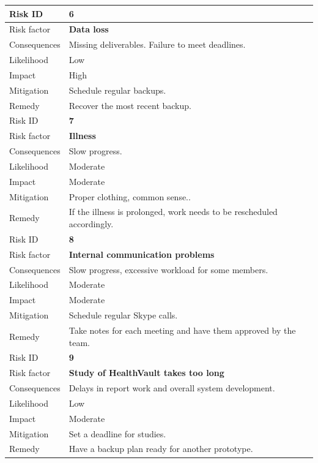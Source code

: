 \begin{table}[h]
\begin{tabular}{ | l | p{11.5cm} | }
  \hline

  Risk ID & \textbf{6} \\
  \hline\noalign{\smallskip}\noalign{\smallskip}\hline
  Risk factor   & \textbf{Data loss} \\
  Consequences  & Missing deliverables. Failure to meet deadlines. \\
  Likelihood    & Low \\
  Impact        & High \\
  Mitigation    & Schedule regular backups. \\
  Remedy        & Recover the most recent backup. \\
  \hline

  \hline\noalign{\smallskip}\noalign{\smallskip}\hline
  Risk ID & \textbf{7} \\
  \hline\noalign{\smallskip}\noalign{\smallskip}\hline
  Risk factor   & \textbf{Illness} \\
  Consequences  & Slow progress. \\
  Likelihood    & Moderate \\
  Impact        & Moderate \\
  Mitigation    & Proper clothing, common sense.. \\
  Remedy        & If the illness is prolonged, work needs to be rescheduled accordingly. \\
  \hline

  \hline\noalign{\smallskip}\noalign{\smallskip}\hline
  Risk ID & \textbf{8} \\
  \hline\noalign{\smallskip}\noalign{\smallskip}\hline
  Risk factor   & \textbf{Internal communication problems} \\
  Consequences  & Slow progress, excessive workload for some members. \\
  Likelihood    & Moderate \\
  Impact        & Moderate \\
  Mitigation    & Schedule regular Skype calls. \\
  Remedy        & Take notes for each meeting and have them approved by the team. \\
  \hline

  \hline\noalign{\smallskip}\noalign{\smallskip}\hline
  Risk ID & \textbf{9} \\
  \hline\noalign{\smallskip}\noalign{\smallskip}\hline
  Risk factor   & \textbf{Study of HealthVault takes too long} \\
  Consequences  & Delays in report work and overall system development. \\
  Likelihood    & Low \\
  Impact        & Moderate \\
  Mitigation    & Set a deadline for studies. \\
  Remedy        & Have a backup plan ready for another prototype. \\
  \hline


\end{tabular}
\end{table}
